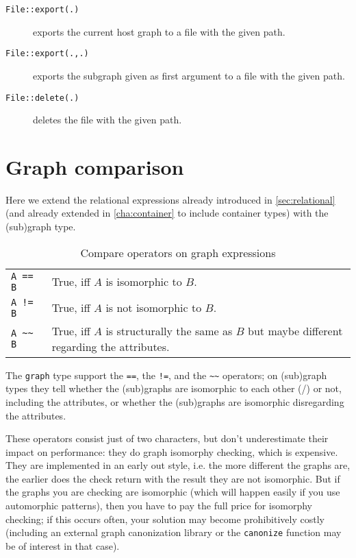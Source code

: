 \begin{description}
\item[\texttt{File::export(.)}] exports the current host graph to a file with the given path.
\item[\texttt{File::export(.,.)}] exports the subgraph given as first argument to a file with the given path.
\item[\texttt{File::delete(.)}] deletes the file with the given path.
\end{description}


\section{Graph comparison}\label{sec:relationalgraph}

Here we extend the relational expressions already introduced in \ref{sec:relational} (and already extended in \ref{cha:container} to include container types) with the (sub)graph type.

\begin{table}[htbp]
  \centering
  \begin{tabularx}{\linewidth}{|l|X|} \hline
    \texttt{A == B} & True, iff $A$ is isomorphic to $B$. \\
    \texttt{A != B} & True, iff $A$ is not isomorphic to $B$. \\
    \texttt{A \textasciitilde\textasciitilde{ } B} & True, iff $A$ is structurally the same as $B$ but maybe different regarding the attributes. \\ \hline
  \end{tabularx}
  \caption{Compare operators on graph expressions}
  \label{compandgraph}
\end{table}

The \texttt{graph} type support the \texttt{==}, the \texttt{!=}, and the \texttt{\textasciitilde\textasciitilde} operators;
on (sub)graph types they tell whether the (sub)graphs are isomorphic to each other (/) or not, including the attributes, or whether the (sub)graphs are isomorphic disregarding the attributes.

These operators consist just of two characters, but don't underestimate their impact on performance:
they do graph isomorphy checking, which is expensive.
They are implemented in an early out style, i.e. the more different the graphs are, the earlier does the check return with the result they are not isomorphic.
But if the graphs you are checking are isomorphic (which will happen easily if you use automorphic patterns), then you have to pay the full price for isomorphy checking; if this occurs often, your solution may become prohibitively costly (including an external graph canonization library or the \texttt{canonize} function may be of interest in that case).

